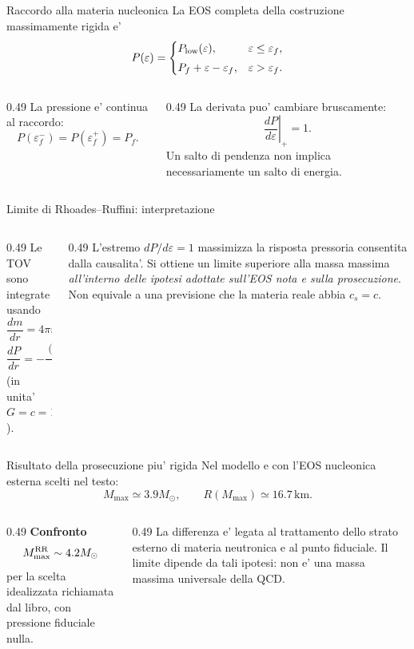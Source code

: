 \begin{frame}{Raccordo alla materia nucleonica}
\small
La EOS completa della costruzione massimamente rigida e'
\[
P(\varepsilon)=
\begin{cases}
P_{\rm low}(\varepsilon),&\varepsilon\leq\varepsilon_f,\\[1mm]
P_f+\varepsilon-\varepsilon_f,&\varepsilon>\varepsilon_f.
\end{cases}
\]
\begin{columns}[T,onlytextwidth]
\begin{column}{0.49\textwidth}
La pressione e' continua al raccordo:
\[
P(\varepsilon_f^-)=P(\varepsilon_f^+)=P_f.
\]
\end{column}
\begin{column}{0.49\textwidth}
La derivata puo' cambiare bruscamente:
\[
\left.\frac{dP}{d\varepsilon}\right|_+=1.
\]
Un salto di pendenza non implica necessariamente un salto di energia.
\end{column}
\end{columns}
\end{frame}

\begin{frame}{Limite di Rhoades--Ruffini: interpretazione}
\small
\begin{columns}[T,onlytextwidth]
\begin{column}{0.49\textwidth}
Le TOV sono integrate usando
\[
\frac{dm}{dr}=4\pi r^2\varepsilon,
\]
\[
\frac{dP}{dr}
=-\frac{(\varepsilon+P)(m+4\pi r^3P)}{r(r-2m)}
\]
(in unita' $G=c=1$).
\end{column}
\begin{column}{0.49\textwidth}
L'estremo $dP/d\varepsilon=1$ massimizza la risposta pressoria consentita dalla causalita'.
\medskip
Si ottiene un limite superiore alla massa massima \textit{all'interno delle ipotesi adottate sull'EOS nota e sulla prosecuzione}.
\medskip
Non equivale a una previsione che la materia reale abbia $c_s=c$.
\end{column}
\end{columns}
\end{frame}

\begin{frame}{Risultato della prosecuzione piu' rigida}
\small
Nel modello e con l'EOS nucleonica esterna scelti nel testo:
\[
M_{\max}\simeq3.9M_\odot,\qquad
R(M_{\max})\simeq16.7\,\mathrm{km}.
\]
\begin{columns}[T,onlytextwidth]
\begin{column}{0.49\textwidth}
\textbf{Confronto}
\[
M_{\max}^{\rm RR}\sim4.2M_\odot
\]
per la scelta idealizzata richiamata dal libro, con pressione fiduciale nulla.
\end{column}
\begin{column}{0.49\textwidth}
La differenza e' legata al trattamento dello strato esterno di materia neutronica e al punto fiduciale.
\medskip
Il limite dipende da tali ipotesi: non e' una massa massima universale della QCD.
\end{column}
\end{columns}
\end{frame}

